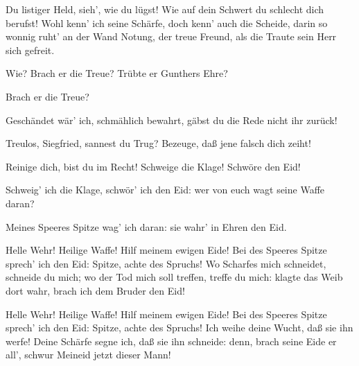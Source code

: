 \begin{drama}
\Brunnhildespeaks

Du listiger Held, sieh', wie du lügst!
Wie auf dein Schwert du schlecht dich berufst!
Wohl kenn' ich seine Schärfe,
doch kenn' auch die Scheide,
darin so wonnig ruht' an der Wand
Notung, der treue Freund,
als die Traute sein Herr sich gefreit.
 



Wie? Brach er die Treue?
Trübte er Gunthers Ehre?
 

Brach er die Treue?
 

\Guntherspeaks



Geschändet wär' ich, schmählich bewahrt,
gäbst du die Rede nicht ihr zurück!
 

\Gutrunespeaks

Treulos, Siegfried, sannest du Trug?
Bezeuge, daß jene falsch dich zeiht!
 

Reinige dich, bist du im Recht!
Schweige die Klage!
Schwöre den Eid!
 

\Siegfriedspeaks

Schweig' ich die Klage,
schwör' ich den Eid:
wer von euch wagt seine Waffe daran?
 

\Hagenspeaks

Meines Speeres Spitze wag' ich daran:
sie wahr' in Ehren den Eid.
 




\Siegfriedspeaks

Helle Wehr! Heilige Waffe!
Hilf meinem ewigen Eide!
Bei des Speeres Spitze sprech' ich den Eid:
Spitze, achte des Spruchs!
Wo Scharfes mich schneidet,
schneide du mich;
wo der Tod mich soll treffen,
treffe du mich:
klagte das Weib dort wahr,
brach ich dem Bruder den Eid!
 

\Brunnhildespeaks



Helle Wehr! Heilige Waffe!
Hilf meinem ewigen Eide!
Bei des Speeres Spitze sprech' ich den Eid:
Spitze, achte des Spruchs!
Ich weihe deine Wucht,
daß sie ihn werfe!
Deine Schärfe segne ich,
daß sie ihn schneide:
denn, brach seine Eide er all',
schwur Meineid jetzt dieser Mann!
 


\end{drama}
